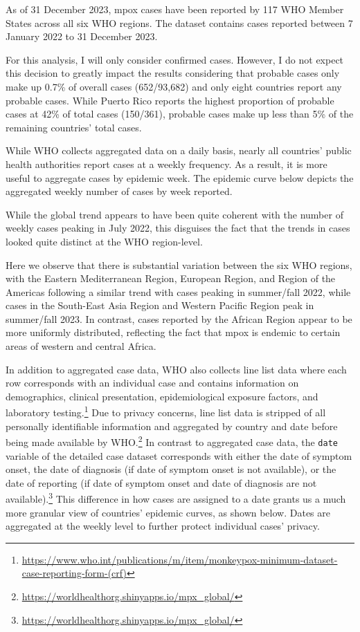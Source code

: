 \documentclass[
  12pt,
]{article}
\begin{document}
As of 31 December 2023, mpox cases have been reported by 117 WHO Member
States across all six WHO regions. The dataset contains cases reported
between 7 January 2022 to 31 December 2023.

For this analysis, I will only consider confirmed cases. However, I do
not expect this decision to greatly impact the results considering that
probable cases only make up 0.7\% of overall cases (652/93,682) and only
eight countries report any probable cases. While Puerto Rico reports the
highest proportion of probable cases at 42\% of total cases (150/361),
probable cases make up less than 5\% of the remaining countries' total
cases.

While WHO collects aggregated data on a daily basis, nearly all
countries' public health authorities report cases at a weekly frequency.
As a result, it is more useful to aggregate cases by epidemic week. The
epidemic curve below depicts the aggregated weekly number of cases by
week reported.

While the global trend appears to have been quite coherent with the
number of weekly cases peaking in July 2022, this disguises the fact
that the trends in cases looked quite distinct at the WHO region-level.

Here we observe that there is substantial variation between the six WHO
regions, with the Eastern Mediterranean Region, European Region, and
Region of the Americas following a similar trend with cases peaking in
summer/fall 2022, while cases in the South-East Asia Region and Western
Pacific Region peak in summer/fall 2023. In contrast, cases reported by
the African Region appear to be more uniformly distributed, reflecting
the fact that mpox is endemic to certain areas of western and central
Africa.

In addition to aggregated case data, WHO also collects line list data
where each row corresponds with an individual case and contains
information on demographics, clinical presentation, epidemiological
exposure factors, and laboratory testing.\footnote{\url{https://www.who.int/publications/m/item/monkeypox-minimum-dataset-case-reporting-form-(crf)}}
Due to privacy concerns, line list data is stripped of all personally
identifiable information and aggregated by country and date before being
made available by WHO.\footnote{\url{https://worldhealthorg.shinyapps.io/mpx_global/}}
In contrast to aggregated case data, the \texttt{date} variable of the
detailed case dataset corresponds with either the date of symptom onset,
the date of diagnosis (if date of symptom onset is not available), or
the date of reporting (if date of symptom onset and date of diagnosis
are not available).\footnote{\url{https://worldhealthorg.shinyapps.io/mpx_global/}}
This difference in how cases are assigned to a date grants us a much
more granular view of countries' epidemic curves, as shown below. Dates
are aggregated at the weekly level to further protect individual cases'
privacy.
\end{document}
